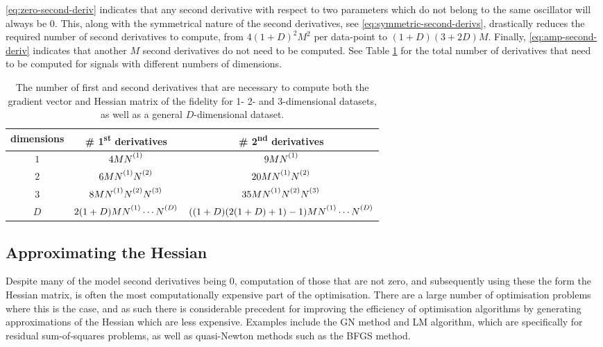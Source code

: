 \eqref{eq:zero-second-deriv} indicates that any second derivative
with respect to two parameters which do not belong to the same oscillator will
always be $0$. This, along with the symmetrical nature of the second derivatives, see
\eqref{eq:symmetric-second-derivs}, drastically reduces the required
number of second derivatives to compute, from $4 (1 + D)^2 M^2$ per data-point
to  $(1+D)\left(3 + 2D\right)M$. Finally, \eqref{eq:amp-second-deriv}
indicates that another $M$ second derivatives do not need to be computed. See
Table \ref{tab:number-of-derivatives} for the total number of derivatives that need
to be computed for signals with different numbers of dimensions.
\begin{table}
    \begin{center}
        \begin{tabular}{ c c c }
            \toprule
            dimensions &
                \# 1\textsuperscript{st} derivatives &
                \# 2\textsuperscript{nd} derivatives\\
            \midrule
            $1$ & $4M\None$ & $9M\None$\\
            $2$ & $6M\None\Ntwo$ & $20M\None\Ntwo$\\
            $3$ & $8M\None\Ntwo\Nthree$ & $35M\None\Ntwo\Nthree$\\
            $D$ &  $2(1 + D)M \None \cdots \ND$ &  $((1 + D)(2(1 + D) + 1) - 1)M \None\cdots\ND$\\
            \bottomrule
        \end{tabular}
    \end{center}
    \caption{
        The number of first and second derivatives that are necessary to
        compute both the gradient vector and Hessian matrix of the fidelity for
        1- 2- and 3-dimensional datasets, as well as a general $D$-dimensional
        dataset.
    }
    \label{tab:number-of-derivatives}
\end{table}

\subsection{Approximating the Hessian}
Despite many of the model second derivatives being $0$, computation of those
that are not zero, and subsequently using these the form the Hessian matrix, is
often the most computationally expensive part of the optimisation. There are a
large number of optimisation problems where this is the case, and as such
there is considerable precedent for improving the efficiency of optimisation
algorithms by generating approximations of the Hessian which are less expensive.
Examples include the \ac{GN} method and \ac{LM} algorithm,
which are specifically for residual sum-of-squares problems\cite[Chapter
10]{Nocedal2006}, as well as quasi-Newton methods such as the BFGS
method\cite[Chapter 6]{Nocedal2006}.

